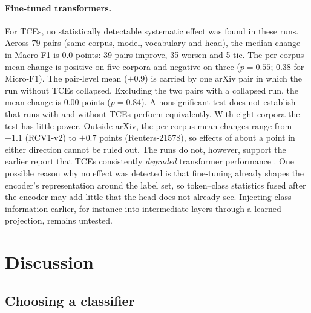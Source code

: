 \documentclass{ijis}
\begin{document}
\paragraph{Fine-tuned transformers.} For TCEs, no statistically detectable systematic effect was found in these runs. Across 79 pairs (same corpus, model, vocabulary and head), the median change in Macro-F1 is 0.0 points: 39 pairs improve, 35 worsen and 5 tie. The per-corpus mean change is positive on five corpora and negative on three ($p = 0.55$; 0.38 for Micro-F1). The pair-level mean ($+0.9$) is carried by one arXiv pair in which the run without TCEs collapsed. Excluding the two pairs with a collapsed run, the mean change is 0.00 points ($p = 0.84$). A nonsignificant test does not establish that runs with and without TCEs perform equivalently. With eight corpora the test has little power. Outside arXiv, the per-corpus mean changes range from $-1.1$ (RCV1-v2) to $+0.7$ points (Reuters-21578), so effects of about a point in either direction cannot be ruled out. The runs do not, however, support the earlier report that TCEs consistently \emph{degraded} transformer performance \cite{worth2025layercake}. One possible reason why no effect was detected is that fine-tuning already shapes the encoder's representation around the label set, so token--class statistics fused after the encoder may add little that the head does not already see. Injecting class information earlier, for instance into intermediate layers through a learned projection, remains untested.

\section{Discussion}\label{sec:discussion}

\subsection{Choosing a classifier}
\end{document}
